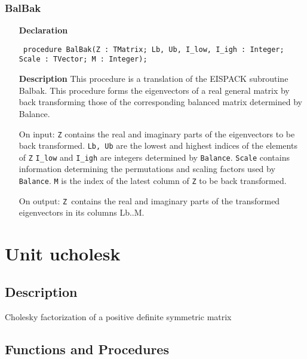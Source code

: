 \documentclass[12pt,a4paper,oneside]{report}
\newcommand{\declarationitem}[1]{\textbf{#1}}
\newcommand{\descriptiontitle}[1]{\textbf{#1}}
\newcommand{\code}[1]{\texttt{#1}}
\begin{document}
\subsubsection{BalBak}
\label{ubalbak-BalBak}
\begin{itemize}\item[\declarationitem{Declaration}\hfill]
	\begin{flushleft}
		\code{
			procedure BalBak(Z : TMatrix; Lb, Ub, I{\_}low, I{\_}igh : Integer; Scale : TVector; M : Integer);}
		
	\end{flushleft}
	
	\par
	\item[\descriptiontitle{Description}]
	This procedure is a translation of the EISPACK subroutine Balbak. This procedure forms the eigenvectors of a real general matrix by back transforming those of the corresponding balanced matrix determined by Balance. 
	
	On input: \code{Z} contains the real and imaginary parts of the eigenvectors to be back transformed. \code{Lb, Ub} are the lowest and highest indices of the elements of \code{Z} \code{I{\_}low} and \code{I{\_}igh} are integers determined by \code{Balance}. \code{Scale} contains information determining the permutations and scaling factors used by \code{Balance}. \code{M} is the index of the latest column of \code{Z} to be back transformed.
	
	On output: \code{Z }contains the real and imaginary parts of the transformed eigenvectors in its columns Lb..M.
	
\end{itemize}
\section{Unit ucholesk}
\label{ucholesk}
\subsection{Description}
Cholesky factorization of a positive definite symmetric matrix
\subsection{Functions and Procedures}
\end{document}
